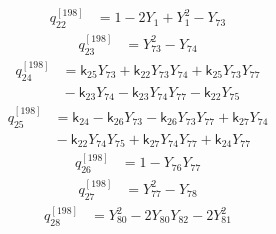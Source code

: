 \begin{equation}\label{q198:row:022}
\begin{aligned}
q_{22}^{[198]} &={} 1 - 2Y_{1} + Y_{1}^{2} - Y_{73}
\end{aligned}
\end{equation}
\begin{equation}\label{q198:row:023}
\begin{aligned}
q_{23}^{[198]} &={} Y_{73}^{2} - Y_{74}
\end{aligned}
\end{equation}
\begin{equation}\label{q198:row:024}
\begin{aligned}
q_{24}^{[198]} &={} \mathsf{k}_{25}Y_{73} + \mathsf{k}_{22}Y_{73}Y_{74} + \mathsf{k}_{25}Y_{73}Y_{77}\\
&{} - \mathsf{k}_{23}Y_{74} - \mathsf{k}_{23}Y_{74}Y_{77} - \mathsf{k}_{22}Y_{75}
\end{aligned}
\end{equation}
\begin{equation}\label{q198:row:025}
\begin{aligned}
q_{25}^{[198]} &={} \mathsf{k}_{24} - \mathsf{k}_{26}Y_{73} - \mathsf{k}_{26}Y_{73}Y_{77} + \mathsf{k}_{27}Y_{74}\\
&{} - \mathsf{k}_{22}Y_{74}Y_{75} + \mathsf{k}_{27}Y_{74}Y_{77} + \mathsf{k}_{24}Y_{77}
\end{aligned}
\end{equation}
\begin{equation}\label{q198:row:026}
\begin{aligned}
q_{26}^{[198]} &={} 1 - Y_{76}Y_{77}
\end{aligned}
\end{equation}
\begin{equation}\label{q198:row:027}
\begin{aligned}
q_{27}^{[198]} &={} Y_{77}^{2} - Y_{78}
\end{aligned}
\end{equation}
\begin{equation}\label{q198:row:028}
\begin{aligned}
q_{28}^{[198]} &={} Y_{80}^{2} - 2Y_{80}Y_{82} - 2Y_{81}^{2}
\end{aligned}
\end{equation}
